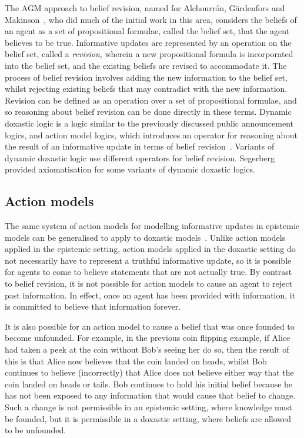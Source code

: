 The AGM approach to belief revision, named for Alchourrón, G{\"a}rdenfors and
Makinson~\cite{alchourron1985logic}, who did much of the initial work in this
area, considers the beliefs of an agent as a set of propositional formulae,
called the belief set, that the agent believes to be true. Informative updates
are represented by an operation on the belief set, called a {\em revision},
wherein a new propositional formula is incorporated into the belief set, and the
existing beliefs are revised to accommodate it. The process of belief revision
involves adding the new information to the belief set, whilst rejecting existing
beliefs that may contradict with the new information. Revision can be defined as
an operation over a set of propositional formulae, and so reasoning about belief
revision can be done directly in these terms. Dynamic doxastic logic is a logic
similar to the previously discussed public announcement logics, and action model
logics, which introduces an operator for reasoning about the result of an
informative update in terms of belief revision~\cite{vanditmarsch2007dynamic}.
Variants of dynamic doxastic logic use different operators for belief revision.
Segerberg~\cite{segerberg2001basic} provided axiomatisation for some variants of
dynamic doxastic logics.

\subsection{Action models}\label{litreview-am-kd45}

The same system of action models for modelling informative updates in epistemic
models can be generalised to apply to doxastic
models~\cite{vanditmarsch2007dynamic}. Unlike action models applied in the
epistemic setting, action models applied in the doxastic setting do not
necessarily have to represent a truthful informative update, so it is possible
for agents to come to believe statements that are not actually true. By contrast
to belief revision, it is not possible for action models to cause an agent to
reject past information. In effect, once an agent has been provided with
information, it is committed to believe that information forever.

It is also possible for an action model to cause a belief that was once founded
to become unfounded. For example, in the previous coin flipping example, if
Alice had taken a peek at the coin without Bob's seeing her do so, then the
result of this is that Alice now believes that the coin landed on heads, whilst
Bob continues to believe (incorrectly) that Alice does not believe either way
that the coin landed on heads or tails. Bob continues to hold his initial belief
because he has not been exposed to any information that would cause that belief
to change. Such a change is not permissible in an epistemic setting, where
knowledge must be founded, but it is permissible in a doxastic setting, where
beliefs are allowed to be unfounded.

